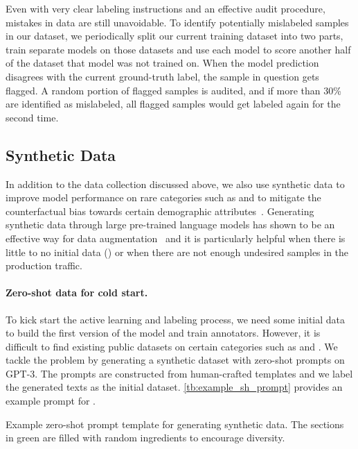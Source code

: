 \documentclass[letterpaper]{article} %
\begin{document}
Even with very clear labeling instructions and an effective audit procedure, mistakes in data are still unavoidable. To identify potentially mislabeled samples in our dataset, we periodically split our current training dataset into two parts, train separate models on those datasets and use each model to score another half of the dataset that model was not trained on. When the model prediction disagrees with the current ground-truth label, the sample in question gets flagged. A random portion of flagged samples is audited, and if more than 30\% are identified as mislabeled, all flagged samples would get labeled again for the second time.


\subsection{Synthetic Data}
\label{sec:synthetic}

In addition to the data collection discussed above, we also use synthetic data to improve model performance on rare categories such as  and to mitigate the counterfactual bias towards certain demographic attributes~\citep{Kusner2017Counterfactual, Garg2019Counterfactual, Dwork2012Fairness}. Generating synthetic data through large pre-trained language models has shown to be an effective way for data augmentation~\cite{anaby2020rescue,kumar2020data,yoo2021gpt3mix} and it is particularly helpful when there is little to no initial data () or when there are not enough undesired samples in the production traffic.

\paragraph{Zero-shot data for cold start.} To kick start the active learning and labeling process, we need some initial data to build the first version of the model and train annotators. However, it is difficult to find existing public datasets on certain categories such as  and . We tackle the problem by generating a synthetic dataset with zero-shot prompts on GPT-3.
The prompts are constructed from human-crafted templates and we label the generated texts as the initial dataset.
\cref{tb:example_sh_prompt} provides an example prompt for .

\begin{table}[!t]
 \centering
 \resizebox{\columnwidth}{!}{}
 \caption{Example zero-shot prompt template for generating synthetic  data. The sections in green are filled with random ingredients to encourage diversity.}
 \label{tb:example_sh_prompt}
\end{table}
\end{document}
